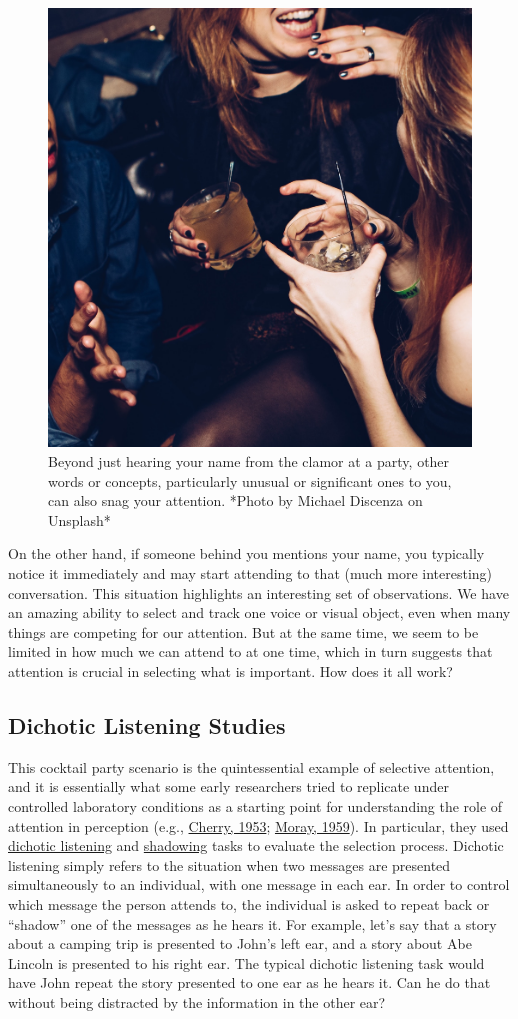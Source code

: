 \documentclass[
]{krantz}
\begin{document}
\begin{figure}

{\centering \includegraphics[width=0.45\linewidth]{images/ch3/cocktailparty} 

}

\caption{Beyond just hearing your name from the clamor at a party, other words or concepts, particularly unusual or significant ones to you, can also snag your attention. *Photo by Michael Discenza on Unsplash*}\label{fig:cocktailparty}
\end{figure}

On the other hand, if someone behind you mentions your name, you typically notice it immediately and may start attending to that (much more interesting) conversation. This situation highlights an interesting set of observations. We have an amazing ability to select and track one voice or visual object, even when many things are competing for our attention. But at the same time, we seem to be limited in how much we can attend to at one time, which in turn suggests that attention is crucial in selecting what is important. How does it all work?

\hypertarget{dichotic-listening-studies}{%
\subsection*{Dichotic Listening Studies}\label{dichotic-listening-studies}}


This cocktail party scenario is the quintessential example of selective attention, and it is essentially what some early researchers tried to replicate under controlled laboratory conditions as a starting point for understanding the role of attention in perception (e.g., \protect\hyperlink{ref-Cherry1953}{Cherry, 1953}; \protect\hyperlink{ref-Moray1959}{Moray, 1959}). In particular, they used \protect\hyperlink{dichotic-listening}{dichotic listening} and \protect\hyperlink{shadowing}{shadowing} tasks to evaluate the selection process. Dichotic listening simply refers to the situation when two messages are presented simultaneously to an individual, with one message in each ear. In order to control which message the person attends to, the individual is asked to repeat back or ``shadow'' one of the messages as he hears it. For example, let's say that a story about a camping trip is presented to John's left ear, and a story about Abe Lincoln is presented to his right ear. The typical dichotic listening task would have John repeat the story presented to one ear as he hears it. Can he do that without being distracted by the information in the other ear?
\end{document}
